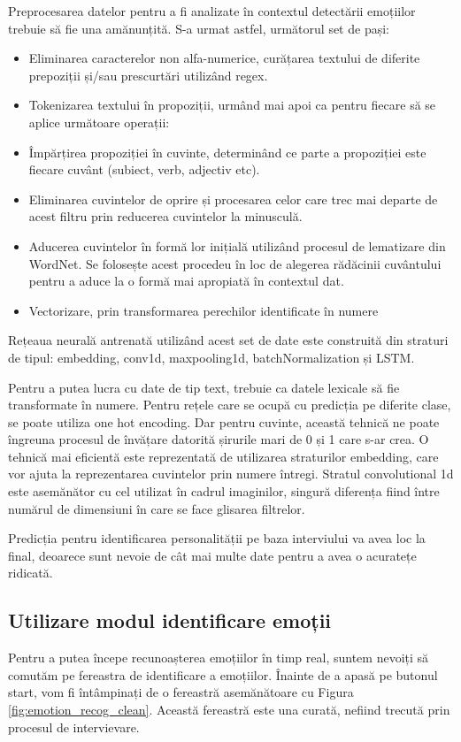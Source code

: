 \documentclass[a4paper, 12pt]{report}
\begin{document}
	Preprocesarea datelor pentru a fi analizate în contextul detectării emoțiilor trebuie să fie una amănunțită. S-a urmat astfel, următorul set de pași:
	\begin{itemize}
		\item Eliminarea caracterelor non alfa-numerice, curățarea textului de diferite prepoziții și/sau prescurtări utilizând regex.
		\item Tokenizarea textului în propoziții, urmând mai apoi ca pentru fiecare să se aplice următoare operații:
		\item Împărțirea propoziției în cuvinte, determinând ce parte a propoziției este fiecare cuvânt (subiect, verb, adjectiv etc).
		\item Eliminarea cuvintelor de oprire și procesarea celor care trec mai departe de acest filtru prin reducerea cuvintelor la minusculă.
		\item Aducerea cuvintelor în formă lor inițială utilizând procesul de lematizare din WordNet. Se folosește acest procedeu în loc de alegerea rădăcinii cuvântului pentru a aduce la o formă mai apropiată în contextul dat.
		\item Vectorizare, prin transformarea perechilor identificate în numere
	\end{itemize}
	
	\bigskip
	
 	Rețeaua neurală antrenată utilizând acest set de date este construită din straturi de tipul: embedding, conv1d, maxpooling1d, batchNormalization și LSTM.

	Pentru a putea lucra cu date de tip text, trebuie ca datele lexicale să fie transformate în numere. Pentru rețele care se ocupă cu predicția pe diferite clase, se poate utiliza one hot encoding. Dar pentru cuvinte, această tehnică ne poate îngreuna procesul de învățare datorită șirurile mari de 0 și 1 care s-ar crea. O tehnică mai eficientă este reprezentată de utilizarea straturilor embedding, care vor ajuta la reprezentarea cuvintelor prin numere întregi. Stratul convolutional 1d este asemănător cu cel utilizat în cadrul imaginilor, singură diferența fiind între numărul de dimensiuni în care se face glisarea filtrelor.

	Predicția pentru identificarea personalității pe baza interviului va avea loc la final, deoarece sunt nevoie de cât mai multe date pentru a avea o acuratețe ridicată.
	
	\clearpage
	\subsection{Utilizare modul identificare emoții}
	Pentru a putea începe recunoașterea emoțiilor în timp real, suntem nevoiți să comutăm pe fereastra de identificare a emoțiilor. Înainte de a apasă pe butonul start, vom fi întâmpinați de o fereastră asemănătoare cu Figura \ref{fig:emotion_recog_clean}. Această fereastră este una curată, nefiind trecută prin procesul de intervievare. 
\end{document}
